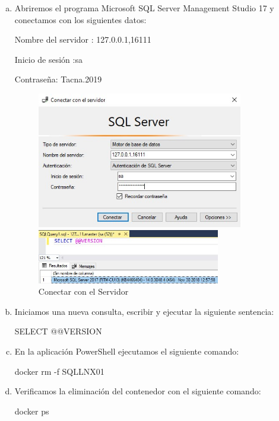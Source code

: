 \documentclass[preprint,12pt]{elsarticle}
\begin{document}
\begin{enumerate}[a)]
\item Abriremos el programa Microsoft SQL Server Management Studio 17 y conectamos con los siguientes datos: 
\begin{center}Nombre del servidor : 127.0.0.1,16111\end{center}
\begin{center} Inicio de sesión :sa\end{center}
\begin{center}Contraseña: Tacna.2019\end{center}
	\begin{figure}[htb]
		\begin{center}
		\includegraphics[width=9cm]{./IMAGENES/Docker13}
		\caption{Conectar con el Servidor}
		\includegraphics[width=8cm]{./IMAGENES/Docker11}
		\end{center}
	\end{figure}

\item Iniciamos una nueva consulta, escribir y ejecutar la siguiente sentencia:
\begin{center}SELECT @@VERSION\end{center}

\item En la aplicación PowerShell ejecutamos el siguiente comando:
\begin{center}docker rm -f SQLLNX01\end{center}
\item Verificamos la eliminación del contenedor con el siguiente comando:
\begin{center}docker ps\end{center}
\end{enumerate}
\end{document}
